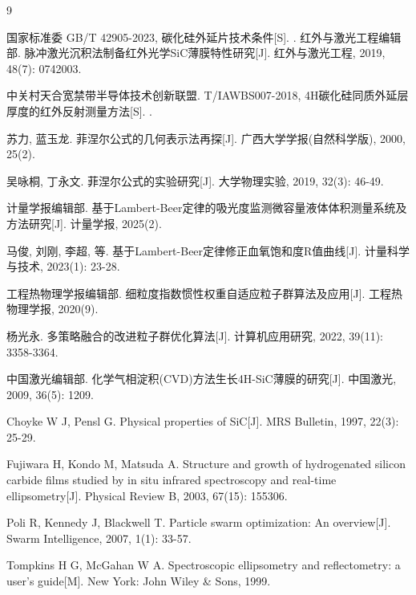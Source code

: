 \documentclass{cumcmthesis}
\begin{document}
\begin{thebibliography}{9}%

国家标准委
\newblock GB/T 42905-2023, 碳化硅外延片技术条件[S].
.
红外与激光工程编辑部.
\newblock 脉冲激光沉积法制备红外光学SiC薄膜特性研究[J].
\newblock 红外与激光工程, 2019, 48(7): 0742003.

中关村天合宽禁带半导体技术创新联盟.
\newblock T/IAWBS007-2018, 4H碳化硅同质外延层厚度的红外反射测量方法[S].
.

苏力, 蓝玉龙.
\newblock 菲涅尔公式的几何表示法再探[J].
\newblock 广西大学学报(自然科学版), 2000, 25(2).

吴咏桐, 丁永文.
\newblock 菲涅尔公式的实验研究[J].
\newblock 大学物理实验, 2019, 32(3): 46-49.

计量学报编辑部.
\newblock 基于Lambert-Beer定律的吸光度监测微容量液体体积测量系统及方法研究[J].
\newblock 计量学报, 2025(2).

马俊, 刘刚, 李超, 等.
\newblock 基于Lambert-Beer定律修正血氧饱和度R值曲线[J].
\newblock 计量科学与技术, 2023(1): 23-28.

工程热物理学报编辑部.
\newblock 细粒度指数惯性权重自适应粒子群算法及应用[J].
\newblock 工程热物理学报, 2020(9).

杨光永.
\newblock 多策略融合的改进粒子群优化算法[J].
\newblock 计算机应用研究, 2022, 39(11): 3358-3364.

中国激光编辑部.
\newblock 化学气相淀积(CVD)方法生长4H-SiC薄膜的研究[J].
\newblock 中国激光, 2009, 36(5): 1209.

Choyke W J, Pensl G.
\newblock Physical properties of SiC[J].
\newblock MRS Bulletin, 1997, 22(3): 25-29.

Fujiwara H, Kondo M, Matsuda A.
\newblock Structure and growth of hydrogenated silicon carbide films studied by in situ infrared spectroscopy and real-time ellipsometry[J].
\newblock Physical Review B, 2003, 67(15): 155306.

Poli R, Kennedy J, Blackwell T.
\newblock Particle swarm optimization: An overview[J].
\newblock Swarm Intelligence, 2007, 1(1): 33-57.

Tompkins H G, McGahan W A.
\newblock Spectroscopic ellipsometry and reflectometry: a user's guide[M].
\newblock New York: John Wiley \& Sons, 1999.


\end{thebibliography}
\end{document}
